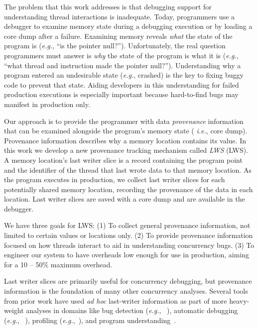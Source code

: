 \documentclass[pageno,nohyperref]{jpaper}
\newcommand{\lws}{LWS\xspace}
\begin{document}
The problem that this work addresses is that debugging support for
understanding thread interactions is inadequate.  Today, programmers use a
debugger to examine memory state during a debugging execution or by loading a
core dump after a failure.  Examining memory reveals {\em what} the state of
the program is ({\em e.g.}, ``is the pointer null?'').  Unfortunately, the real
question programmers must answer is {\em why} the state of the program is what
it is ({\em e.g.}, ``what thread and instruction made the pointer null?'').
Understanding why a program entered an undesirable state ({\em e.g.}, crashed)
is the key to fixing buggy code to prevent that state.  Aiding developers in
this understanding for failed production executions is especially important
because hard-to-find bugs may manifest in production only.



Our approach is to provide the programmer with data {\em provenance}
information that can be examined alongside the program's memory state ({\em
i.e.}, core dump).  Provenance information describes why a memory location
contains its value.  In this work we develop a new provenance tracking
mechanism called {\em \lws} (LWS).  A memory location's last writer slice is a
record containing the program point and the identifier of the thread that last
wrote data to that memory location.  As the program executes in production, we
collect last writer slices for each potentially shared memory location,
recording the provenance of the data in each location.  Last writer slices are
saved with a core dump and are available in the debugger.

We have three goals for \lws:  (1) To collect general provenance information,
not limited to certain values or locations only. (2) To provide provenance
information focused on how threads interact to aid in understanding concurrency
bugs. (3) To engineer our system to have overheads low enough for use in
production, aiming for a 10 -- 50\% maximum overhead. 

Last writer slices are primarily useful for concurrency debugging, but
provenance information is the foundation of many other concurrency analyses.
Several tools from prior work have used {\em ad hoc} last-writer information as
part of more heavy-weight analyses in domains like bug detection ({\em e.g.},
~\cite{dmtracker,avio}), automatic debugging ({\em e.g.},
~\cite{recon,conseq,cci}), profiling ({\em e.g.},~\cite{threadclustering,
schedpredictionmodel}), and program understanding~\cite{oshatr}. 
\end{document}
